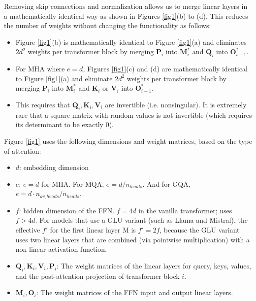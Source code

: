 \documentclass{article}
\newcommand{\mat}[1]{\mathbf{#1}}  %
\def\Q{\mat{Q}_i}
\def\K{\mat{K}_i}
\def\V{\mat{V}_i}
\def\P{\mat{P}_i}
\def\O{\mat{O}_{i-1}}
\def\M{\mat{M}_i}
\begin{document}
Removing skip connections and normalization allows us to merge linear layers in a mathematically identical way as shown in Figures \ref{fig1}(b) to (d). This reduces the number of weights without changing the functionality as follows:
\begin{itemize}[topsep=-1pt, itemsep=-1pt]
  \item Figure \ref{fig1}(b) is mathematically identical to Figure \ref{fig1}(a) and eliminates $2d^2$ weights per transformer block by merging $\P$ into $\M^*$ and $\Q$ into $\O^*$.
  \item For MHA where $e = d$, Figures \ref{fig1}(c) and (d) are mathematically identical to Figure \ref{fig1}(a) and eliminate $2d^2$ weights per transformer block by merging $\P$ into $\M^*$ and $\K$ or $\V$ into $\O^*$.
  \item This requires that $\Q, \K, \V$ are invertible (i.e. nonsingular). It is extremely rare that a square matrix with random values is not invertible \cite{invertible} (which requires its determinant to be exactly 0).
\end{itemize}

Figure \ref{fig1} uses the following dimensions and weight matrices, based on the type of attention:
\begin{itemize}[topsep=-1pt, itemsep=-1pt]
  \item $d$: embedding dimension
  \item $e$: $e = d$ for MHA. For MQA, $e = d / n_{heads}$. And for GQA, $e = d \cdot n_{kv\_heads} / n_{heads}$.
  \item $f$: hidden dimension of the FFN. $f = 4d$ in the vanilla transformer; \citet{MQA} uses $f > 4d$. For models that use a GLU variant \cite{GLU} (such as Llama and Mistral), the effective $f'$ for the first linear layer M is $f' = 2f$, because the GLU variant uses two linear layers that are combined (via pointwise multiplication) with a non-linear activation function.
  \item $\Q, \K, \V, \P$: The weight matrices of the linear layers for query, keys, values, and the post-attention projection of transformer block $i$.
  \item $\M, \mat{O}_i$: The weight matrices of the FFN input and output linear layers.
\end{itemize}
\end{document}
